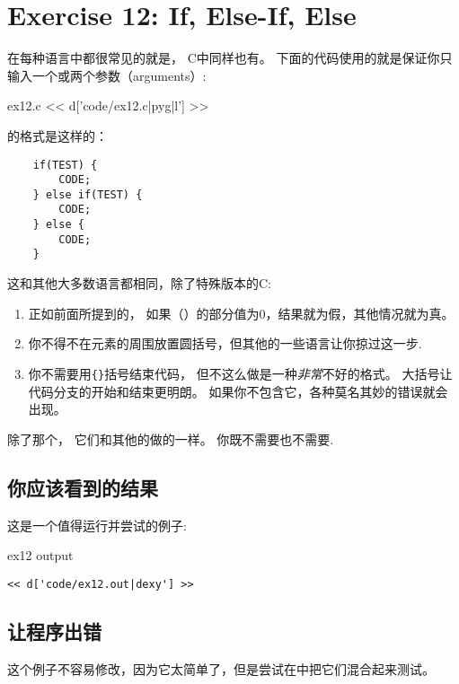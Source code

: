 \chapter{Exercise 12: If, Else-If, Else}

在每种语言中都很常见的就是， C中同样也有。 下面的代码使用的就是保证你只输入一个或两个参数（arguments）:

\begin{code}{ex12.c}
<< d['code/ex12.c|pyg|l'] >>
\end{code}

的格式是这样的：

\begin{Verbatim}
    if(TEST) {
        CODE;
    } else if(TEST) {
        CODE;
    } else {
        CODE;
    }
\end{Verbatim}

这和其他大多数语言都相同，除了特殊版本的C:

\begin{enumerate}
\item 正如前面所提到的， 如果（）的部分值为0，结果就为假，其他情况就为真。
\item 你不得不在元素的周围放置圆括号，但其他的一些语言让你掠过这一步.
\item 你不需要用\verb|{}|括号结束代码， 但不这么做是一种\emph{非常}不好的格式。 大括号让代码分支的开始和结束更明朗。 如果你不包含它，各种莫名其妙的错误就会出现。
\end{enumerate}

除了那个， 它们和其他的做的一样。 你既不需要也不需要.

\section{你应该看到的结果}

这是一个值得运行并尝试的例子:

\begin{code}{ex12 output}
\begin{lstlisting}
<< d['code/ex12.out|dexy'] >>
\end{lstlisting}
\end{code}

\section{让程序出错}
这个例子不容易修改，因为它太简单了，但是尝试在中把它们混合起来测试。

